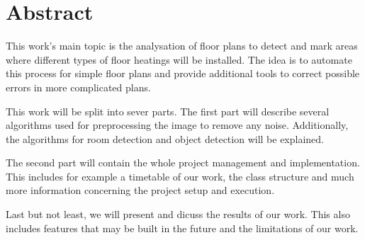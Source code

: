 \section{Abstract}
This work's main topic is the analysation of floor plans to detect and mark areas where different types of floor heatings will be installed. The idea is to automate this process for simple floor plans and provide additional tools to correct possible errors in more complicated plans.

This work will be split into sever parts. The first part will describe several algorithms used for preprocessing the image to remove any noise. Additionally, the algorithms for room detection and object detection will be explained.

The second part will contain the whole project management and implementation. This includes for example a timetable of our work, the class structure and much more information concerning the project setup and execution.

Last but not least, we will present and dicuss the results of our work. This also includes features that may be built in the future and the limitations of our work.  